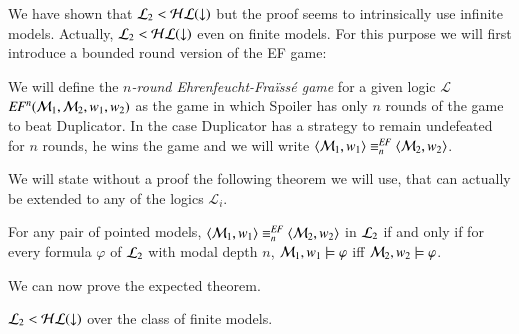 
We have shown that $\mathcal{L}_2 < \mathcal{HL}({\downarrow})$ but the proof seems to intrinsically
use infinite models.  Actually, $\mathcal{L}_2 < \mathcal{HL}({\downarrow})$ even on finite models. For this purpose we will first introduce a bounded round version of the EF game:
%
\begin{defn}
We will define the \emph{$n$-round Ehrenfeucht-Fra\"iss\'e game} for a given logic $\mathcal{L}$ $\mathit{EF}^n(\mathcal{M}_1, \mathcal{M}_2, w_1, w_2)$ as the game in which Spoiler has only $n$ rounds of the game to beat Duplicator. In the case Duplicator has a strategy to remain undefeated for $n$ rounds, he wins the game and we will write $\langle \mathcal{M}_1,w_1 \rangle\equiv^{\mathit{EF}}_n\langle \mathcal{M}_2,w_2 \rangle$.
\end{defn}
%
We will state without a proof the following theorem we will use, that can actually be extended to any of the logics $\mathcal{L}_i$.
\begin{thm}
For any pair of pointed models, $\langle \mathcal{M}_1,w_1 \rangle\equiv^{\mathit{EF}}_n\langle \mathcal{M}_2,w_2 \rangle$ in $\mathcal{L}_2$ if and only if for every formula $\varphi$ of $\mathcal{L}_2$ with modal depth $n$, $\mathcal{M}_1,w_1\models\varphi$ iff $\mathcal{M}_2,w_2\models\varphi$.
\end{thm}
%
We can now prove the expected theorem.
\begin{thm}\label{thm:tle_leq_hlogic_fin}
$\mathcal{L}_2 < \mathcal{HL}({\downarrow})$ over the class of finite models.
\end{thm}
